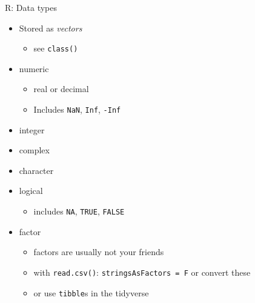 \documentclass[
  ignorenonframetext,
]{beamer}
\providecommand{\tightlist}{%
  \setlength{\itemsep}{0pt}\setlength{\parskip}{0pt}}
\begin{document}
\begin{frame}[fragile]{R: Data types}
\protect\hypertarget{r-data-types}{}

\begin{itemize}
\tightlist
\item
  Stored as \emph{vectors}

  \begin{itemize}
  \tightlist
  \item
    see \texttt{class()}
  \end{itemize}
\item
  numeric

  \begin{itemize}
  \tightlist
  \item
    real or decimal
  \item
    Includes \texttt{NaN}, \texttt{Inf}, \texttt{-Inf}
  \end{itemize}
\item
  integer
\item
  complex
\item
  character
\item
  logical

  \begin{itemize}
  \tightlist
  \item
    includes \texttt{NA}, \texttt{TRUE}, \texttt{FALSE}
  \end{itemize}
\item
  factor

  \begin{itemize}
  \tightlist
  \item
    factors are usually not your friends
  \item
    with \texttt{read.csv()}: \texttt{stringsAsFactors\ =\ F} or convert
    these
  \item
    or use \texttt{tibble}s in the tidyverse
  \end{itemize}
\end{itemize}

\end{frame}
\end{document}
